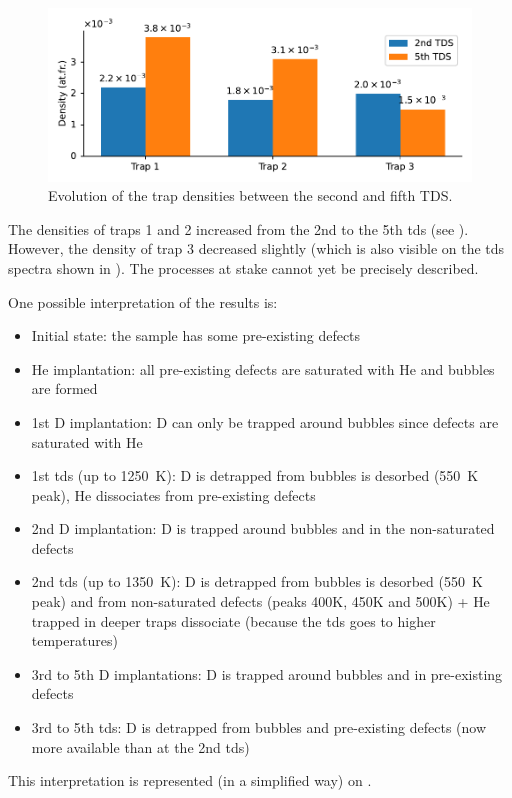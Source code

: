 \begin{figure}
    \centering
    \includegraphics[width=\linewidth]{Figures/Chapter5/trap_densities.pdf}
    \caption{Evolution of the trap densities between the second and fifth TDS.}
\end{figure}

The densities of traps 1 and 2 increased from the 2nd to the 5th \gls{tds} (see ).
However, the density of trap 3 decreased slightly (which is also visible on the \gls{tds} spectra shown in ).
The processes at stake cannot yet be precisely described. 

One possible interpretation of the results is:
\begin{itemize}
    \item Initial state: the sample has some pre-existing defects %
    \item \gls{He} implantation: all pre-existing defects are saturated with \gls{He} and bubbles are formed
    \item 1st D implantation: D can only be trapped around bubbles since defects are saturated with \gls{He}
    \item 1st \gls{tds} (up to \SI{1250}{K}): D is detrapped from bubbles is desorbed (\SI{550}{K} peak), \gls{He} dissociates from pre-existing defects 
    \item 2nd D implantation: D is trapped around bubbles and in the non-saturated defects
    \item 2nd \gls{tds} (up to \SI{1350}{K}): D is detrapped from bubbles is desorbed (\SI{550}{K} peak) and from non-saturated defects (peaks 400K, 450K and 500K) + \gls{He} trapped in deeper traps dissociate (because the \gls{tds} goes to higher temperatures)
    \item 3rd to 5th D implantations: D is trapped around bubbles and in pre-existing defects
    \item 3rd to 5th \gls{tds}: D is detrapped from bubbles and pre-existing defects (now more available than at the 2nd \gls{tds})
\end{itemize}
This interpretation is represented (in a simplified way) on .


